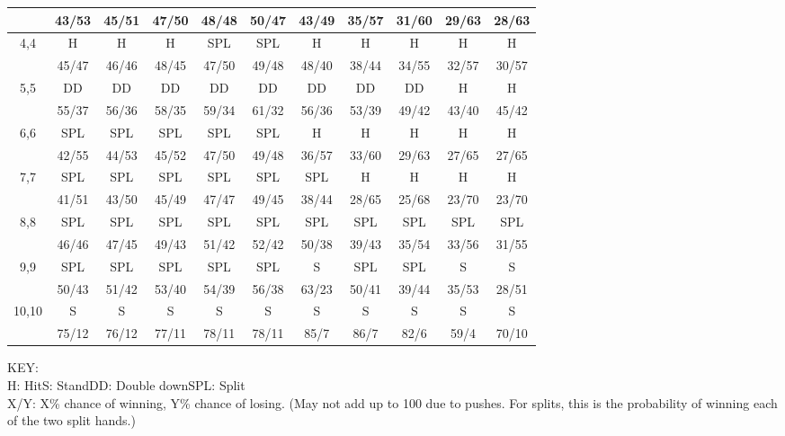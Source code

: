 \documentclass{article}
\begin{document}
\begin{small}
\begin{tabular}{c|c|c|c|c|c|c|c|c|c|c|}
 & 43/53  & 45/51  & 47/50  & 48/48  & 50/47  & 43/49  & 35/57  & 31/60  & 29/63  & 28/63 \\
\hline
4,4  & H  & H  & H  & SPL  & SPL  & H  & H  & H  & H  & H \\
 & 45/47  & 46/46  & 48/45  & 47/50  & 49/48  & 48/40  & 38/44  & 34/55  & 32/57  & 30/57 \\
\hline
5,5  & DD  & DD  & DD  & DD  & DD  & DD  & DD  & DD  & H  & H \\
 & 55/37  & 56/36  & 58/35  & 59/34  & 61/32  & 56/36  & 53/39  & 49/42  & 43/40  & 45/42 \\
\hline
6,6  & SPL  & SPL  & SPL  & SPL  & SPL  & H  & H  & H  & H  & H \\
 & 42/55  & 44/53  & 45/52  & 47/50  & 49/48  & 36/57  & 33/60  & 29/63  & 27/65  & 27/65 \\
\hline
7,7  & SPL  & SPL  & SPL  & SPL  & SPL  & SPL  & H  & H  & H  & H \\
 & 41/51  & 43/50  & 45/49  & 47/47  & 49/45  & 38/44  & 28/65  & 25/68  & 23/70  & 23/70 \\
\hline
8,8  & SPL  & SPL  & SPL  & SPL  & SPL  & SPL  & SPL  & SPL  & SPL  & SPL \\
 & 46/46  & 47/45  & 49/43  & 51/42  & 52/42  & 50/38  & 39/43  & 35/54  & 33/56  & 31/55 \\
\hline
9,9  & SPL  & SPL  & SPL  & SPL  & SPL  & S  & SPL  & SPL  & S  & S \\
 & 50/43  & 51/42  & 53/40  & 54/39  & 56/38  & 63/23  & 50/41  & 39/44  & 35/53  & 28/51 \\
\hline
10,10  & S  & S  & S  & S  & S  & S  & S  & S  & S  & S \\
 & 75/12  & 76/12  & 77/11  & 78/11  & 78/11  & 85/7  & 86/7  & 82/6  & 59/4  & 70/10 \\
\hline
\end{tabular}

\end{small}

\vspace{.1in}
\noindent KEY:\\
H: Hit\quad S: Stand\quad DD: Double down\quad SPL: Split\\
X/Y: X\% chance of winning, Y\% chance of losing. (May not add up to 100 due to pushes. For splits, this is the probability of winning each of the two split hands.)
\end{document}
